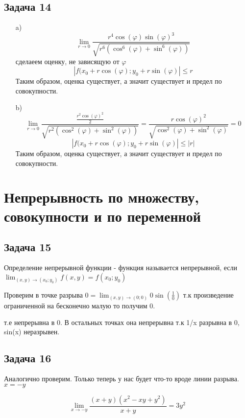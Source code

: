 \documentclass[a4paper,12pt]{article}
\begin{document}
\subsection{Задача 14}

\begin{enumerate}
    \item[a)]   \[
                \lim_{r \to 0} \frac{r^4\cos(\varphi)\sin(\varphi)^3}{\sqrt{r^6(\cos^6(\varphi)+\sin^6(\varphi))}}
                \]
                сделаеем оценку, не зависящую от $\varphi$
                \[
                |f(x_0+r\cos(\varphi); y_0 + r\sin(\varphi)| \le r
                \]
                Таким образом, оценка существует, а значит существует и предел по совокупности.
    \item[b)]   \[
                \lim_{r \to 0} \frac{\frac{r^2\cos(\varphi)^2}{2}}{\sqrt{r^2(\cos^2(\varphi)+\sin^2(\varphi))}}=\frac{r\cos(\varphi)^2}{\sqrt{\cos^2(\varphi)+\sin^2(\varphi)}} = 0
                \]
                \[
                |f(x_0+r\cos(\varphi); y_0 + r\sin(\varphi)| \le |r|
                \]
                Таким образом, оценка существует, а значит существует и предел по совокупности.
\end{enumerate}


\section{Непрерывность по множеству, совокупности и по переменной}

\subsection{Задача 15}
Определение непрерывной функции - функция называется непрерывной, если $\lim_{(x,y) \to (x_0;y_0)}f(x, y)=f(x_0;y_0)$

Проверим в точке разрыва $0=\lim_{(x,y) \to (0;0)} 0\sin(\frac{1}{0})$ т.к произведение ограниченной на бесконечно малую то получим 0.  

т.е непрерывна в 0. В остальных точках она непрерывна т.к 1/x разрывна в 0, sin(x) неразрывен.

\subsection{Задача 16}
Аналогично проверим. Только теперь у нас будет что-то вроде линии разрыва. $x=-y$

\[
\lim_{x \to -y} \frac{(x+y)(x^2-xy+y^2)}{x+y} = 3y^2 
\]
\end{document}
